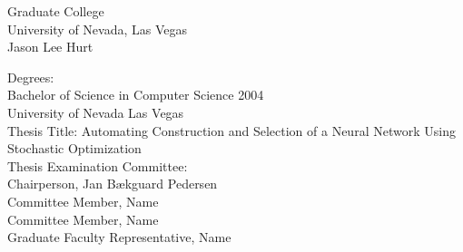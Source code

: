 \documentclass[12pt]{report}
\numberwithin{algorithm}{chapter}
\begin{document}
\thesistitlepage


\newpage

\newpage


\tableofcontents

\newpage
\listoftables
\listoffigures













\newpage
{}

\newpage
\begin{thesisvita}
\begin{center}
Graduate College\\
University of Nevada, Las Vegas\\[1cm]
Jason Lee Hurt\\[1cm]
\end{center}

\noindent Degrees:\\
\indent Bachelor of Science in Computer Science 2004\\
\indent University of Nevada Las Vegas\\

\noindent Thesis Title: Automating Construction and Selection of a
Neural Network Using Stochastic Optimization\\

\noindent Thesis Examination Committee:\\
\indent Chairperson, Jan B\ae{}kguard Pedersen\\
\indent Committee Member, Name\\
\indent Committee Member, Name \\
\indent Graduate Faculty Representative, Name

\end{thesisvita}
\end{document}
